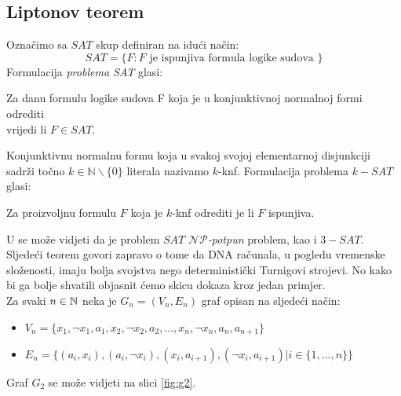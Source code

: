 \documentclass[12pt, a4paper]{book}
\begin{document}
\begin{spacing}{1.5}
\subsection{Liptonov teorem}
Označimo sa $SAT$ skup definiran na idući način:
\[SAT=\{F: F \textrm{ je ispunjiva formula logike sudova }\}\]
Formulacija \textit{problema SAT} glasi:\\
\begin{center}
Za danu formulu logike sudova F koja je u konjunktivnoj normalnoj formi odrediti\\ vrijedi li $F \in  SAT$.
\end{center}
Konjunktivnu normalnu formu koja u svakoj svojoj elementarnoj disjunkciji sadrži točno $k \in \mathbb{N} \backslash \{0\}$ literala nazivamo $k$-knf. Formulacija problema $k-SAT$ glasi:
\begin{center}
	Za proizvoljnu formulu $F$ koja je $k$-knf odrediti je li $F$ ispunjiva. 
\end{center} 
U \cite[str. ~276-283]{Sipser} se može vidjeti da je problem $SAT$ \textit{$\mathcal{NP}$-potpun} problem, kao i $3-SAT$.
Sljedeći teorem govori zapravo o tome da DNA računala, u pogledu vremenske složenosti, imaju bolja svojstva nego deterministički Turnigovi strojevi. No kako bi ga bolje shvatili objasnit ćemo skicu dokaza kroz jedan primjer.\\
Za svaki $n\in \mathbb{N}$ neka je $G_n=(V_n, E_n)$ graf opisan na sljedeći način:
\begin{itemize}
\item $V_n=\{x_1, \neg x_1, a_1, x_2, \neg x_2, a_2,..., x_n, \neg x_n, a_n, a_{n+1}\}$
\item  $E_n=\{(a_i, x_i), (a_i, \neg x_i), (x_i, a_{i+1}), (\neg x_i, a_{i+1}) | i \in \{1,...,n\}\}$
\end{itemize}
\begin{exa}
Graf $G_2$ se može vidjeti na slici \ref{fig:g2}.
\begin{figure}[!h]
\begin{center}
\end{center}
\end{figure}
\end{exa}
\end{spacing}
\end{document}
